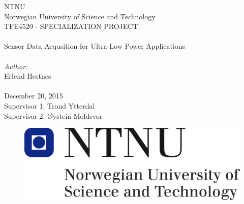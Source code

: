 \thispagestyle{empty}

\begin{center}

\Large{NTNU}\\
\normalsize{Norwegian University of Science and Technology}\\
[3pc]
\Large{TFE4520 - SPECIALIZATION PROJECT}\\

\Huge{\hrulefill\\Sensor Data Acqusition for Ultra-Low Power Applications\\\hrulefill}\\[2pc]
\small{\textit{Author:}}\\\Large{Erlend Hestnes}\\
\mbox{}\\[3pc]
\large{December 20, 2015}\\[2pc]

\small{Supervisor 1: Trond Ytterdal} \\
\small{Supervisor 2: Øystein Moldsvor}

\end{center}
\vfill

\begin{figure}[h]
\centering
\includegraphics[scale=0.5]{fig/NTNU.png}
\label{fig:frontpage_logo}
\end{figure}
